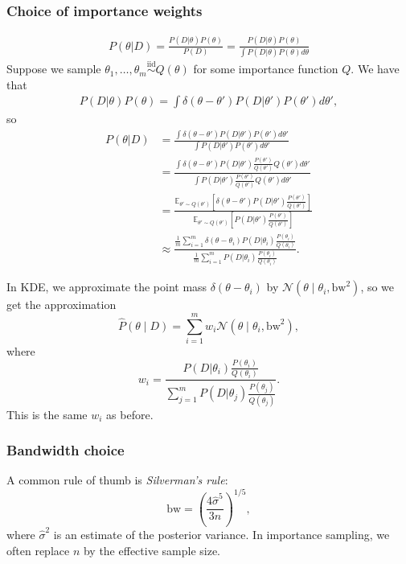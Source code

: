 \documentclass[11pt, titlepage]{article} %
\numberwithin{equation}{section}
\theoremstyle{definition}
\numberwithin{assumption}{section}
\begin{document}
\subsubsection*{Choice of importance weights}
\begin{align*}
    P(\theta|D)=\frac{P(D|\theta)P(\theta)}{P(D)}=\frac{P(D|\theta)P(\theta)}{\int P(D|\theta)P(\theta) d\theta}
\end{align*}
Suppose we sample $\theta_1,\dots,\theta_m \overset{\mathrm{iid}}{\sim} Q(\theta)$ for some importance function $Q$. We have that 
\begin{align*}
    P(D|\theta)P(\theta)=\int\delta(\theta-\theta')P(D|\theta')P(\theta')d\theta',
\end{align*}
so
\begin{align*}
     P(\theta|D)&=\frac{\int\delta(\theta-\theta')P(D|\theta')P(\theta')d\theta'}{\int P(D|\theta')P(\theta') d\theta'}\\
     &=\frac{\int\delta(\theta-\theta')P(D|\theta')\frac{P(\theta')}{Q(\theta')}Q(\theta')d\theta'}{\int P(D|\theta')\frac{P(\theta')}{Q(\theta')}Q(\theta') d\theta'}\\
     &=\frac{\mathbb{E}_{\theta'\sim Q(\theta')}[\delta(\theta-\theta')P(D|\theta')\frac{P(\theta')}{Q(\theta')}]}{\mathbb{E}_{\theta'\sim Q(\theta')}[P(D|\theta')\frac{P(\theta')}{Q(\theta')}]}\\
     &\approx\frac{\frac{1}{m}\sum_{i=1}^m \delta(\theta-\theta_i)P(D|\theta_i)\frac{P(\theta_i)}{Q(\theta_i)} }{\frac{1}{m}\sum_{i=1}^m P(D|\theta_i)\frac{P(\theta_i)}{Q(\theta_i)} }.
\end{align*}

In KDE, we approximate the point mass $\delta(\theta-\theta_i)$ by $\mathcal{N}(\theta\mid\theta_i,\mathrm{bw}^2)$, so we get the approximation
\begin{equation*}
    \hat P(\theta\mid D) = \sum_{i=1}^m w_i \mathcal{N}(\theta\mid\theta_i,\mathrm{bw}^2),
\end{equation*}
where
\begin{equation*}
    w_i = \frac{P(D|\theta_i)\frac{P(\theta_i)}{Q(\theta_i)} }{\sum_{j=1}^m P(D|\theta_j)\frac{P(\theta_j)}{Q(\theta_j)} }.
\end{equation*}
This is the same $w_i$ as before. 

\subsubsection*{Bandwidth choice}

A common rule of thumb is \textit{Silverman's rule}:
\begin{equation*}
    \mathrm{bw}
    =
    \left(\frac{4\hat\sigma^5}{3n}\right)^{1/5},
\end{equation*}
where $\hat\sigma^2$ is an estimate of the posterior variance. In importance sampling, we often replace $n$ by the effective sample size.
\end{document}
